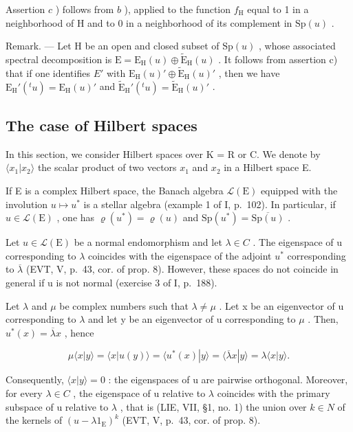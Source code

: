 Assertion \(c\) ) follows from \(b\) ), applied to the function \(f_{\mathrm{H}}\) equal to 1 in a neighborhood of H and to 0 in a neighborhood of its complement in \(\mathrm{Sp}(u)\) .

Remark. --- Let H be an open and closed subset of \(\mathrm{Sp}(u)\) , whose associated spectral decomposition is \(\mathrm{E} = \mathrm{E}_{\mathrm{H}}(u) \oplus \widetilde{\mathrm{E}}_{\mathrm{H}}(u)\) . It follows from assertion c) that if one identifies \(E'\) with \(\mathrm{E}_{\mathrm{H}}(u)' \oplus \widetilde{\mathrm{E}}_{\mathrm{H}}(u)'\) , then we have \(\mathrm{E}_{\mathrm{H}}'(^{t}u) = \mathrm{E}_{\mathrm{H}}(u)'\) and \(\widetilde{\mathrm{E}}_{\mathrm{H}}'(^{t}u) = \widetilde{\mathrm{E}}_{\mathrm{H}}(u)'\) .

\subsection{The case of Hilbert spaces}

In this section, we consider Hilbert spaces over K = R or C. We denote by \(\langle x_{1}|x_{2}\rangle\) the scalar product of two vectors \(x_{1}\) and \(x_{2}\) in a Hilbert space E.

If E is a complex Hilbert space, the Banach algebra \(\mathcal{L}(\mathrm{E})\) equipped with the involution \(u\mapsto u^{*}\) is a stellar algebra (example 1 of I, p.~102). In particular, if \(u\in \mathcal{L}(\mathrm{E})\) , one has \(\varrho (u^{*}) = \varrho (u)\) and \(\mathrm{Sp}(u^{*}) = \overline{\mathrm{Sp}(u)}\) .

Let \(u \in \mathcal{L}(\mathrm{E})\) be a normal endomorphism and let \(\lambda \in C\) . The eigenspace of u corresponding to \(\lambda\) coincides with the eigenspace of the adjoint \(u^{*}\) corresponding to \(\overline{\lambda}\) (EVT, V, p.~43, cor. of prop. 8). However, these spaces do not coincide in general if u is not normal (exercise 3 of I, p.~188).

Let \(\lambda\) and \(\mu\) be complex numbers such that \(\lambda \neq \mu\) . Let x be an eigenvector of u corresponding to \(\lambda\) and let y be an eigenvector of u corresponding to \(\mu\) . Then, \(u^{*}(x) = \overline{\lambda}x\) , hence

\[
\mu \langle x | y \rangle = \langle x | u (y) \rangle = \langle u ^ {*} (x) | y \rangle = \langle \overline {{\lambda}} x | y \rangle = \lambda \langle x | y \rangle .
\]

Consequently, \(\langle x|y\rangle = 0\) : the eigenspaces of u are pairwise orthogonal. Moreover, for every \(\lambda \in C\) , the eigenspace of u relative to \(\lambda\) coincides with the primary subspace of u relative to \(\lambda\) , that is (LIE, VII, §1, no. 1) the union over \(k \in N\) of the kernels of \((u - \lambda1_{\mathrm{E}})^{k}\) (EVT, V, p.~43, cor. of prop. 8).

